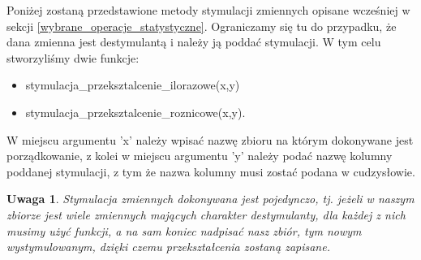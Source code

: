 \documentclass[12pt,a4paper]{report}
\newtheorem{uwaga}{Uwaga}
\begin{document}
{Poniżej zostaną przedstawione metody stymulacji zmiennych opisane wcześniej w sekcji \ref{wybrane_operacje_statystyczne}. Ograniczamy
się tu do przypadku, że dana zmienna jest destymulantą i należy
ją poddać stymulacji. W tym celu stworzyliśmy dwie funkcje:
\begin{itemize}
\item stymulacja\_przeksztalcenie\_ilorazowe(x,y)
\item stymulacja\_przeksztalcenie\_roznicowe(x,y).
\end{itemize}
W miejscu argumentu 'x'
należy wpisać nazwę zbioru na którym dokonywane jest porządkowanie, z
kolei w miejscu argumentu 'y' należy podać nazwę kolumny poddanej
stymulacji, z tym że nazwa kolumny musi zostać podana w cudzysłowie.

\begin{Shaded}
\begin{Highlighting}[]
\NormalTok{\{}
  \NormalTok{:}
  \NormalTok{\{}
    \NormalTok{x[i,}\NormalTok{(}\NormalTok{(x)==y)]=}\NormalTok{/x[i,}\NormalTok{(}\NormalTok{(x)==y)]}
  \NormalTok{\}}
\NormalTok{\}}
\end{Highlighting}
\end{Shaded}

\begin{Shaded}
\begin{Highlighting}[]
\NormalTok{\{}
  \NormalTok{(x[}\NormalTok{(}\NormalTok{(x)==y)])}
  \NormalTok{:}
  \NormalTok{\{}
    \NormalTok{x[i,}\NormalTok{(}\NormalTok{(x)==y)]=max_wartosc-x[i,}\NormalTok{(}\NormalTok{(x)==y)]}
  \NormalTok{\}}
\NormalTok{\}}
\end{Highlighting}
\end{Shaded}

\begin{uwaga} Stymulacja zmiennych dokonywana jest pojedynczo, tj. jeżeli w
naszym zbiorze jest wiele zmiennych mających charakter destymulanty, dla
każdej z nich musimy użyć funkcji, a na sam koniec nadpisać nasz zbiór,
tym nowym wystymulowanym, dzięki czemu przekształcenia zostaną zapisane.
\end{uwaga}

}
\end{document}
